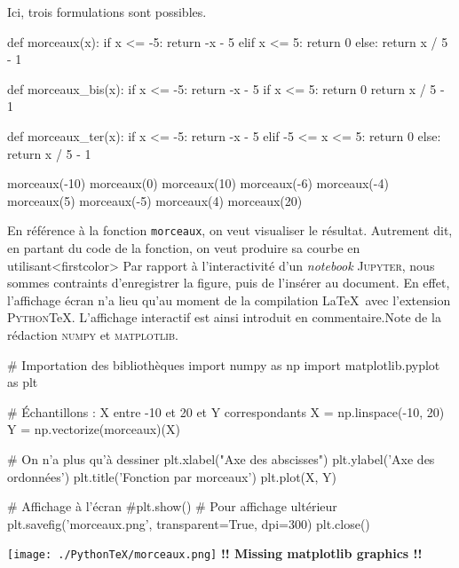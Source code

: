 \begin{solution}
Ici, trois formulations sont possibles.
\begin{idleconsole}
\begin{pyconsole}
def morceaux(x):
    if x <= -5:
        return -x - 5
    elif x <= 5:
        return 0
    else:
        return x / 5 - 1

def morceaux_bis(x):
    if x <= -5:
        return -x - 5
    if x <= 5:
        return 0
    return x / 5 - 1

def morceaux_ter(x):
    if x <= -5:
        return -x - 5
    elif -5 <= x <= 5:
        return 0
    else:
        return x / 5 - 1

morceaux(-10)
morceaux(0)
morceaux(10)
morceaux(-6)
morceaux(-4)
morceaux(5)
morceaux(-5)
morceaux(4)
morceaux(20)
\end{pyconsole}
\end{idleconsole}

En référence à la fonction \texttt{morceaux}, on veut visualiser le résultat. Autrement dit, en partant du code de la fonction, on veut produire sa courbe en utilisant\caution[t]<firstcolor>{%
Par rapport à l'interactivité d'un \textit{notebook} \textsc{Jupyter}, nous sommes contraints d'enregistrer la figure, puis de l'insérer au document. En effet, l'affichage écran n'a lieu qu'au moment de la compilation \LaTeX\ avec l’extension \textsc{Python}\TeX{}. L'affichage interactif est ainsi introduit en commentaire.}{Note de la rédaction}
 \textsc{numpy} et \textsc{matplotlib}. 

\begin{idleconsole}
\begin{pyconsole}
# Importation des bibliothèques
import numpy as np
import matplotlib.pyplot as plt

# Échantillons : X entre -10 et 20 et Y correspondants
X = np.linspace(-10, 20) 
Y = np.vectorize(morceaux)(X)

# On n'a plus qu'à dessiner
plt.xlabel("Axe des abscisses")
plt.ylabel('Axe des ordonnées')
plt.title('Fonction par morceaux')
plt.plot(X, Y)

# Affichage à l'écran
#plt.show() 
# Pour affichage ultérieur
plt.savefig('morceaux.png', transparent=True, dpi=300)
plt.close()
\end{pyconsole}
\end{idleconsole}


\begin{center}
\vspace{-.75\baselineskip}
%
  {\texttt{[image: ./PythonTeX/morceaux.png]}}%
  {\textbf{!! Missing matplotlib graphics !!}}%
\end{center}
\vspace{-.75\baselineskip}
\end{solution}

